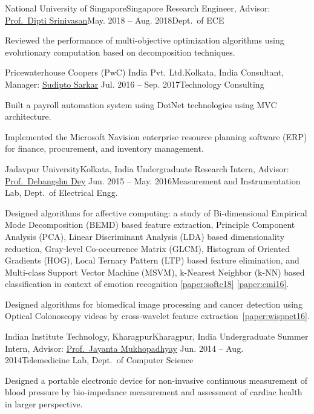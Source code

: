\documentclass[letterpaper,11pt]{article}
\begin{document}
\resumeSubheading 
{National University of Singapore}{Singapore}
{Research Engineer, Advisor: \href{https://www.ece.nus.edu.sg/gems/profhome.html}{Prof.\ Dipti Srinivasan}}{May. 2018 -- Aug. 2018}{Dept.\ of ECE}
\resumeItemListStart
\item {Reviewed the performance of multi-objective optimization algorithms using evolutionary computation based on decomposition techniques.}
\resumeItemListEnd

\resumeSubheading
{Pricewaterhouse Coopers (PwC) India Pvt. Ltd.}{Kolkata, India}
{Consultant, Manager: \href{https://www.linkedin.com/in/sudipt0sarkar/?originalSubdomain=in}{Sudipto Sarkar}}
{Jul. 2016 -- Sep. 2017}{Technology Consulting}
\resumeItemListStart
\item {Built a payroll automation system using DotNet technologies using MVC architecture.}
\item {Implemented the Microsoft Navision enterprise resource planning software (ERP) for finance, procurement, and inventory management.}
\resumeItemListEnd

\resumeSubheading
{Jadavpur University}{Kolkata, India}
{Undergraduate Research Intern, Advisor: 
{\href{https://scholar.google.com/citations?hl=en&user=tlzV8CAAAAAJ&view_op=list_works&sortby=pubdate}{Prof.\ Debangshu Dey}}}
{Jun. 2015 -- May. 2016}{Measurement and Instrumentation Lab, Dept.\ of Electrical Engg.}
\resumeItemListStart
\item {Designed algorithms for affective computing: a study of Bi-dimensional Empirical Mode Decomposition (BEMD) based feature extraction, Principle Component Analysis (PCA), Linear Discriminant Analysis (LDA) based dimensionality reduction, Gray-level Co-occurrence Matrix (GLCM), Histogram of Oriented Gradients (HOG), Local Ternary Pattern (LTP) based feature elimination, and Multi-class Support Vector Machine (MSVM), k-Nearest Neighbor (k-NN) based classification in context of emotion recognition \ref{paper:softc18} \ref{paper:cmi16}}.
\item {Designed algorithms for biomedical image processing and cancer detection using Optical Colonoscopy videos by cross-wavelet feature extraction~\ref{paper:wispnet16}}.
\resumeItemListEnd

\resumeSubheading
{Indian Institute Technology, Kharagpur}{Kharagpur, India}
{Undergraduate Summer Intern, Advisor: \href{http://www.facweb.iitkgp.ac.in/~jay/}{Prof.\ Jayanta Mukhopadhyay}}
{Jun. 2014 -- Aug. 2014}{Telemedicine Lab, Dept.\ of Computer Science}
\resumeItemListStart
\item {Designed a portable electronic device for non-invasive continuous measurement of blood pressure by bio-impedance measurement and assessment of cardiac health in larger perspective.}
\resumeItemListEnd
\resumeSubHeadingListEnd
\end{document}
